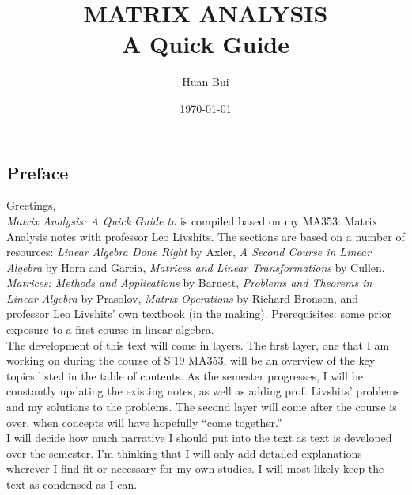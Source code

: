 \documentclass{article}
\theoremstyle{definition}
\begin{document}
	\begin{titlepage}\centering
		\clearpage
		\title{\textsc{\bf{MATRIX ANALYSIS}}\\\smallskip A Quick Guide\\}
		\author{\bigskip Huan Bui}
		\date{\today}
		\maketitle
		\thispagestyle{empty}
	\end{titlepage}

\newpage

\subsection*{Preface}

Greetings,\\

\textit{Matrix Analysis: A Quick Guide to} is compiled based on my MA353: Matrix Analysis notes with professor Leo Livshits. The sections are based on a number of resources: \textit{Linear Algebra Done Right} by Axler, \textit{A Second Course in Linear Algebra} by Horn and Garcia, \textit{Matrices and Linear Transformations} by Cullen, \textit{Matrices: Methods and Applications} by Barnett, \textit{Problems and Theorems in Linear Algebra} by Prasolov, \textit{Matrix Operations} by Richard Bronson, and professor Leo Livshits' own textbook (in the making). Prerequisites: some prior exposure to a first course in linear algebra.\\

The development of this text will come in layers. The first layer, one that I am working on during the course of S'19 MA353, will be an overview of the key topics listed in the table of contents. As the semester progresses, I will be constantly updating the existing notes, as well as adding prof. Livshits' problems and my solutions to the problems. The second layer will come after the course is over, when concepts will have hopefully ``come together.''\\ 

I will decide how much narrative I should put into the text as text is developed over the semester. I'm thinking that I will only add detailed explanations wherever I find fit or necessary for my own studies. I will most likely keep the text as condensed as I can.\\
\end{document}
